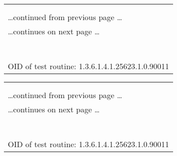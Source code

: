 \documentclass{article}
\begin{document}
\begin{longtable}{|p{}|}
\hline
\rowcolor{openvas_note}{\color{white}{Low (CVSS: 0.0) }}\\
\rowcolor{openvas_note}{\color{white}{NVT: SMB Test}}\\
\hline
\endfirsthead
\hfill\ldots continued from previous page \ldots \\
\hline
\endhead
\hline
\ldots continues on next page \ldots \\
\endfoot
\hline
\endlastfoot
\\
\rowcolor{white}{\verb=OS Version =\verb-=-\verb= WINDOWS VISTA (TM) BUSINESS 6000=}\\
\rowcolor{white}{\verb=Domain =\verb-=-\verb= WORKGROUP=}\\
\rowcolor{white}{\verb=SMB Serverversion =\verb-=-\verb= WINDOWS VISTA (TM) BUSINESS 6.0=}\\
\rowcolor{white}{\verb==}\\
\rowcolor{white}{\verb==}\\
\\
OID of test routine: 1.3.6.1.4.1.25623.1.0.90011\\
\end{longtable}

\begin{longtable}{|p{}|}
\hline
\rowcolor{openvas_note}{\color{white}{Low (CVSS: 0.0) }}\\
\rowcolor{openvas_note}{\color{white}{NVT: SMB Test}}\\
\hline
\endfirsthead
\hfill\ldots continued from previous page \ldots \\
\hline
\endhead
\hline
\ldots continues on next page \ldots \\
\endfoot
\hline
\endlastfoot
\\
\rowcolor{white}{\verb=OS Version =\verb-=-\verb= WINDOWS VISTA (TM) BUSINESS 6000=}\\
\rowcolor{white}{\verb=Domain =\verb-=-\verb= WORKGROUP=}\\
\rowcolor{white}{\verb=SMB Serverversion =\verb-=-\verb= Windows Vista (TM) Business 6.0=}\\
\rowcolor{white}{\verb==}\\
\rowcolor{white}{\verb==}\\
\\
OID of test routine: 1.3.6.1.4.1.25623.1.0.90011\\
\end{longtable}
\end{document}
